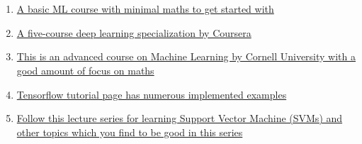 \documentclass{article}
\begin{document}
    \section*{}
    \begin{enumerate}
        \item \href{https://www.coursera.org/learn/machine-learning#syllabus}{A basic ML course with minimal maths to get started with}
        \item \href{https://www.coursera.org/specializations/deep-learning#courses}{A five-course deep learning specialization by Coursera}
        \item \href{https://youtube.com/playlist?list=PLl8OlHZGYOQ7bkVbuRthEsaLr7bONzbXS}{This is an advanced course on Machine Learning by Cornell University with a good amount of focus on maths}
        \item \href{https://www.tensorflow.org/tutorials}{Tensorflow tutorial page has numerous implemented examples}
        \item \href{https://www.youtube.com/watch?v=_PwhiWxHK8o}{Follow this lecture series for learning Support Vector Machine (SVMs) and other topics which you find to be good in this series}
    \end{enumerate}
\end{document}
